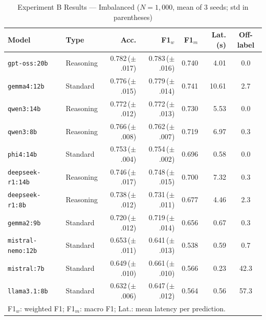 \documentclass[a4paper,fleqn]{cas-dc}
\begin{document}
\begin{table}[!t]
  \renewcommand{\arraystretch}{1.2}
  \caption{Experiment B Results --- Imbalanced ($N = 1{,}000$, mean of 3 seeds; std in parentheses)}
  \label{tab:results_imbalanced}
  \centering
  \scriptsize
  \setlength{\tabcolsep}{4pt}
  \begin{tabular}{@{}llrrrrc@{}}
    \toprule
    \textbf{Model} & \textbf{Type} & \textbf{Acc.} & \textbf{F1$_w$} & \textbf{F1$_m$} & \textbf{Lat.(s)} & \textbf{Off-label} \\
    \midrule
    \texttt{gpt-oss:20b}      & Reasoning & 0.782\,({\footnotesize$\pm$.017}) & 0.783\,({\footnotesize$\pm$.016}) & 0.740 &  4.01 & 0.0 \\
    \texttt{gemma4:12b}       & Standard  & 0.776\,({\footnotesize$\pm$.015}) & 0.779\,({\footnotesize$\pm$.014}) & 0.741 & 10.61 & 2.7 \\
    \texttt{qwen3:14b}        & Reasoning & 0.772\,({\footnotesize$\pm$.012}) & 0.772\,({\footnotesize$\pm$.013}) & 0.730 &  5.53 & 0.0 \\
    \texttt{qwen3:8b}         & Reasoning & 0.766\,({\footnotesize$\pm$.008}) & 0.762\,({\footnotesize$\pm$.007}) & 0.719 &  6.97 & 0.3 \\
    \texttt{phi4:14b}         & Standard  & 0.753\,({\footnotesize$\pm$.004}) & 0.754\,({\footnotesize$\pm$.002}) & 0.696 &  0.58 & 0.0 \\
    \texttt{deepseek-r1:14b}  & Reasoning & 0.746\,({\footnotesize$\pm$.017}) & 0.748\,({\footnotesize$\pm$.015}) & 0.700 &  7.32 & 0.3 \\
    \texttt{deepseek-r1:8b}   & Reasoning & 0.738\,({\footnotesize$\pm$.012}) & 0.731\,({\footnotesize$\pm$.011}) & 0.677 &  4.46 & 2.3 \\
    \texttt{gemma2:9b}        & Standard  & 0.720\,({\footnotesize$\pm$.012}) & 0.719\,({\footnotesize$\pm$.014}) & 0.656 &  0.67 & 0.3 \\
    \texttt{mistral-nemo:12b} & Standard  & 0.653\,({\footnotesize$\pm$.011}) & 0.641\,({\footnotesize$\pm$.013}) & 0.538 &  0.59 & 0.7 \\
    \texttt{mistral:7b}       & Standard  & 0.649\,({\footnotesize$\pm$.010}) & 0.661\,({\footnotesize$\pm$.010}) & 0.566 &  0.23 & 42.3 \\
    \texttt{llama3.1:8b}      & Standard  & 0.632\,({\footnotesize$\pm$.006}) & 0.647\,({\footnotesize$\pm$.012}) & 0.564 &  0.56 & 57.3 \\
    \bottomrule
    \multicolumn{7}{l}{\footnotesize F1$_w$: weighted F1; F1$_m$: macro F1; Lat.: mean latency per prediction.}
  \end{tabular}
\end{table}
\end{document}
